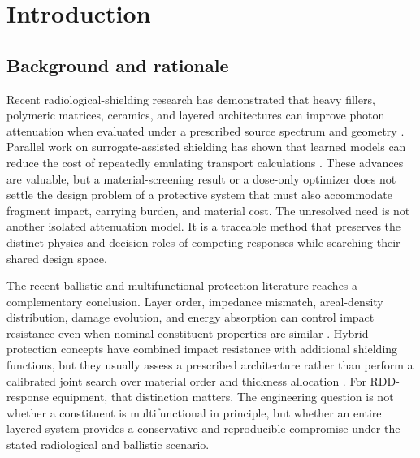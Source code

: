 \documentclass[12pt]{elsarticle}
\begin{document}
	\section{Introduction}

	\subsection{Background and rationale}

	Recent radiological-shielding research has demonstrated that heavy fillers, polymeric matrices, ceramics, and layered architectures can improve photon attenuation when evaluated under a prescribed source spectrum and geometry \cite{MoreEtAl2021,PrabhuEtAl2023,GilysEtAl2022,AlDhuhaibatEtAl2021}. Parallel work on surrogate-assisted shielding has shown that learned models can reduce the cost of repeatedly emulating transport calculations \cite{Forrester2008Surrogate}. These advances are valuable, but a material-screening result or a dose-only optimizer does not settle the design problem of a protective system that must also accommodate fragment impact, carrying burden, and material cost. The unresolved need is not another isolated attenuation model. It is a traceable method that preserves the distinct physics and decision roles of competing responses while searching their shared design space.

	The recent ballistic and multifunctional-protection literature reaches a complementary conclusion. Layer order, impedance mismatch, areal-density distribution, damage evolution, and energy absorption can control impact resistance even when nominal constituent properties are similar \cite{TasdemirciTunusoglu2017,JiangEtAl2022,BiswasDatta2022,WangEtAl2024}. Hybrid protection concepts have combined impact resistance with additional shielding functions, but they usually assess a prescribed architecture rather than perform a calibrated joint search over material order and thickness allocation \cite{MarxRabiei2017CMF,Derradji2020Hybrid,Mehelli2021BallisticRadiation}. For RDD-response equipment, that distinction matters. The engineering question is not whether a constituent is multifunctional in principle, but whether an entire layered system provides a conservative and reproducible compromise under the stated radiological and ballistic scenario.
	
\end{document}

